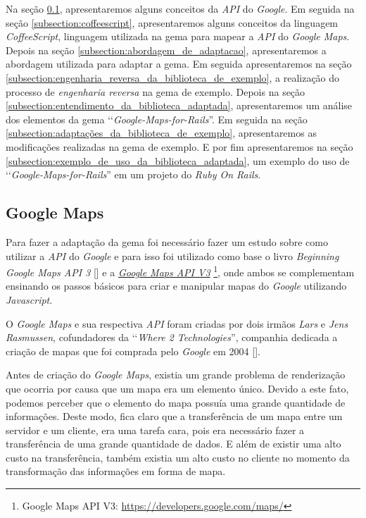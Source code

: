 Na seção \ref{subsection:google_maps}, apresentaremos alguns conceitos da \emph{API} do
\emph{Google}. Em seguida na seção \ref{subsection:coffeescript}, apresentaremos alguns conceitos da linguagem
\emph{CoffeeScript}, linguagem utilizada na gema para mapear a \emph{API} do \emph{Google Maps}. Depois na
seção \ref{subsection:abordagem_de_adaptacao}, apresentaremos a abordagem utilizada para adaptar a gema. Em
seguida apresentaremos na seção \ref{subsection:engenharia_reversa_da_biblioteca_de_exemplo}, a realização
do processo de \emph{engenharia reversa} na gema de exemplo. Depois na seção
\ref{subsection:entendimento_da_biblioteca_adaptada}, apresentaremos um análise dos elementos da gema
‘‘\emph{Google-Maps-for-Rails}''. Em seguida na seção \ref{subsection:adaptações_da_biblioteca_de_exemplo},
apresentaremos as modificações realizadas na gema de exemplo. E por fim apresentaremos na seção
\ref{subsection:exemplo_de_uso_da_biblioteca_adaptada}, um exemplo do uso de ‘‘\emph{Google-Maps-for-Rails}''
em um projeto do \emph{Ruby On Rails}.


\subsection{Google Maps}
\label{subsection:google_maps}


Para fazer a adaptação da gema foi necessário fazer um estudo sobre como utilizar a \emph{API} do
\emph{Google} e para isso foi utilizado como base o livro \emph{Beginning Google Maps API 3}
[] e a
\emph{\href{https://developers.google.com/maps/}{Google Maps API V3}}
\footnote{Google Maps API V3: \url{https://developers.google.com/maps/}}, onde ambos se complementam
ensinando os passos básicos para criar e manipular mapas do \emph{Google} utilizando \emph{Javascript}.

O \emph{Google Maps} e sua respectiva \emph{API} foram criadas por dois irmãos \emph{Lars} e
\emph{Jens Rasmussen}, cofundadores da ‘‘\emph{Where 2 Technologies}'', companhia dedicada a criação de mapas
que foi comprada pelo \emph{Google} em 2004 [].

Antes de criação do \emph{Google Maps}, existia um grande problema de renderização que ocorria por causa
que um mapa era um elemento único. Devido a este fato, podemos perceber que o elemento do mapa
possuía uma grande quantidade de informações. Deste modo, fica claro que a transferência de um mapa entre
um servidor e um cliente, era uma tarefa cara, pois era necessário fazer a transferência de uma grande
quantidade de dados. E além de existir uma alto custo na transferência, também existia um alto custo no
cliente no momento da transformação das informações em forma de mapa.

